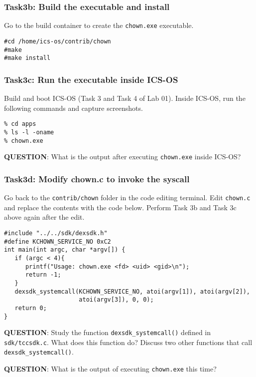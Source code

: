 \documentclass[a4paper, 11pt,oneside]{article}
\begin{document}
\subsubsection*{Task3b: Build the executable and install}
Go to the build container to create the \texttt{chown.exe} executable.
\begin{verbatim}
#cd /home/ics-os/contrib/chown
#make
#make install
\end{verbatim}

\subsubsection*{Task3c: Run the executable inside ICS-OS}
Build and boot ICS-OS (Task 3 and Task 4 of Lab 01). Inside ICS-OS, run the 
following commands and capture screenshots.

\begin{verbatim}
% cd apps
% ls -l -oname
% chown.exe
\end{verbatim}

\textbf{QUESTION}: What is the output after executing \texttt{chown.exe} inside 
ICS-OS? \newline

\subsubsection*{Task3d: Modify chown.c to invoke the syscall}
Go back to the \texttt{contrib/chown} folder in the code editing terminal. Edit 
\texttt{chown.c} and replace the contents with the code below. Perform Task 3b 
and Task 3c above again after the edit.

\begin{verbatim}
#include "../../sdk/dexsdk.h"
#define KCHOWN_SERVICE_NO 0xC2
int main(int argc, char *argv[]) {
   if (argc < 4){ 
      printf("Usage: chown.exe <fd> <uid> <gid>\n");
      return -1; 
   }   
   dexsdk_systemcall(KCHOWN_SERVICE_NO, atoi(argv[1]), atoi(argv[2]), 
                     atoi(argv[3]), 0, 0); 
   return 0;
}
\end{verbatim}

\textbf{QUESTION}: Study the function \texttt{dexsdk\_systemcall()} defined in 
\texttt{sdk/tccsdk.c}. What does this function do? Discuss two other functions 
that call \texttt{dexsdk\_systemcall()}. \newline 

\textbf{QUESTION}: What is the output of executing \texttt{chown.exe} this time?
\end{document}
